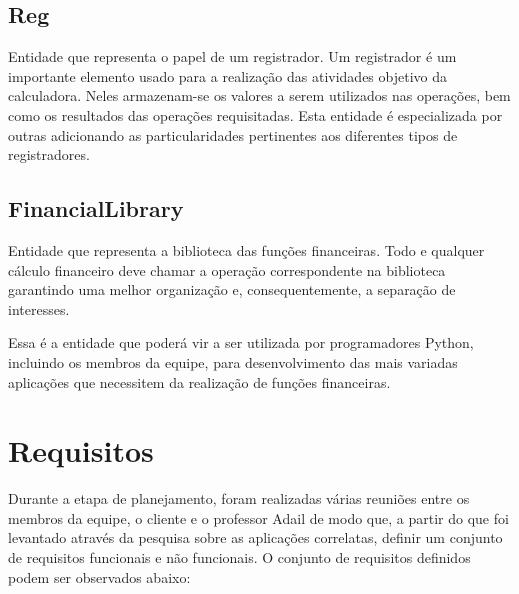 \subsection{Reg}
Entidade que representa o papel de um registrador. Um registrador é um importante elemento usado para a realização das atividades objetivo da calculadora. Neles armazenam-se os valores a serem utilizados nas operações, bem como os resultados das operações requisitadas. Esta entidade é especializada por outras adicionando as particularidades pertinentes aos diferentes tipos de registradores.

\subsection{FinancialLibrary}
Entidade que representa a biblioteca das funções financeiras. Todo e qualquer cálculo financeiro deve chamar a operação correspondente na biblioteca garantindo uma melhor organização e, consequentemente, a separação de interesses.

Essa é a entidade que poderá vir a ser utilizada por programadores Python, incluindo os membros da equipe, para desenvolvimento das mais variadas aplicações que necessitem da realização de funções financeiras.

\section{Requisitos}

Durante a etapa de planejamento, foram realizadas várias reuniões entre os membros da equipe, o cliente e o professor Adail de modo que, a partir do que foi levantado através da pesquisa sobre as aplicações correlatas, definir um conjunto de requisitos funcionais e não funcionais. O conjunto de requisitos definidos podem ser observados abaixo:


